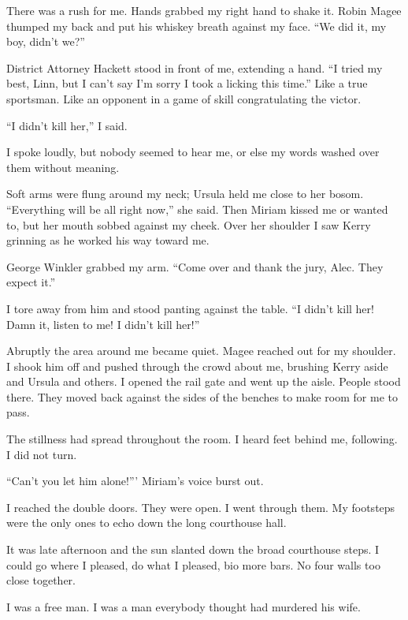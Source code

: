 \documentclass{novel}
\begin{document}
{There was a rush for me. Hands grabbed my right hand to shake it. Robin Magee thumped my back and put his whiskey breath against my face. “We did it, my boy, didn’t we?”

District Attorney Hackett stood in front of me, extending a hand. “I tried my best, Linn, but I can’t say I’m sorry I took a licking this time.” Like a true sportsman. Like an opponent in a game of skill congratulating the victor.

“I didn’t kill her,” I said.

I spoke loudly, but nobody seemed to hear me, or else my words washed over them without meaning.

Soft arms were flung around my neck; Ursula held me close to her bosom. “Everything will be all right now,” she said. Then Miriam kissed me or wanted to, but her mouth sobbed against my cheek. Over her shoulder I saw Kerry grinning as he worked his way toward me.

George Winkler grabbed my arm. “Come over and thank the jury, Alec. They expect it.”

I tore away from him and stood panting against the table. “I didn’t kill her! Damn it, listen to me! I didn’t kill her!”

Abruptly the area around me became quiet. Magee reached out for my shoulder. I shook him off and pushed through the crowd about me, brushing Kerry aside and Ursula and others. I opened the rail gate and went up the aisle. People stood there. They moved back against the sides of the benches to make room for me to pass.

The stillness had spread throughout the room. I heard feet behind me, following. I did not turn.

“Can’t you let him alone!”’ Miriam’s voice burst out.

I reached the double doors. They were open. I went through them. My footsteps were the only ones to echo down the long courthouse hall.

It was late afternoon and the sun slanted down the broad courthouse steps. I could go where I pleased, do what I pleased, bio more bars. No four walls too close together.

I was a free man. I was a man everybody thought had murdered his wife.

}

\vspace{2\nbs}
\clearpage
\thispagestyle{empty}
\end{document}
